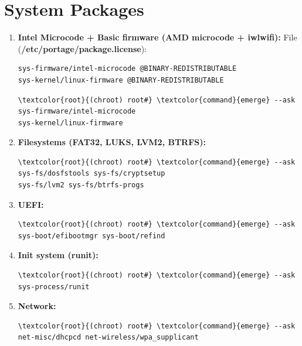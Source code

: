 \documentclass[10pt, a4paper, onecolumn, oneside, titlepage, openany]{book}
\begin{document}
\section{System Packages}
\begin{enumerate}
    \item \textbf{Intel Microcode + Basic firmware (AMD microcode + iwlwifi):}
\newline File (\textbf{\textcolor{file}{/etc/portage/package.license}}):
\begin{Verbatim}[commandchars=\\\{\}]
sys-firmware/intel-microcode @BINARY-REDISTRIBUTABLE
sys-kernel/linux-firmware @BINARY-REDISTRIBUTABLE
\end{Verbatim}
\begin{Verbatim}[commandchars=\\\{\}]
\textcolor{root}{(chroot) root#} \textcolor{command}{emerge} --ask sys-firmware/intel-microcode
sys-kernel/linux-firmware
\end{Verbatim}
    \item \textbf{Filesystems (FAT32, LUKS, LVM2, BTRFS):}
\begin{Verbatim}[commandchars=\\\{\}]
\textcolor{root}{(chroot) root#} \textcolor{command}{emerge} --ask sys-fs/dosfstools sys-fs/cryptsetup
sys-fs/lvm2 sys-fs/btrfs-progs
\end{Verbatim}
    \item \textbf{UEFI:}
\begin{Verbatim}[commandchars=\\\{\}]
\textcolor{root}{(chroot) root#} \textcolor{command}{emerge} --ask sys-boot/efibootmgr sys-boot/refind
\end{Verbatim}
    \item \textbf{Init system (runit):}
\begin{Verbatim}[commandchars=\\\{\}]
\textcolor{root}{(chroot) root#} \textcolor{command}{emerge} --ask sys-process/runit
\end{Verbatim}
    \item \textbf{Network:}
\begin{Verbatim}[commandchars=\\\{\}]
\textcolor{root}{(chroot) root#} \textcolor{command}{emerge} --ask net-misc/dhcpcd net-wireless/wpa_supplicant
\end{Verbatim}
\end{enumerate}
\end{document}
